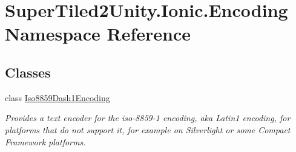 \hypertarget{namespace_super_tiled2_unity_1_1_ionic_1_1_encoding}{}\section{Super\+Tiled2\+Unity.\+Ionic.\+Encoding Namespace Reference}
\label{namespace_super_tiled2_unity_1_1_ionic_1_1_encoding}
\subsection*{Classes}
\begin{DoxyCompactItemize}
\item 
class \mbox{\hyperlink{class_super_tiled2_unity_1_1_ionic_1_1_encoding_1_1_iso8859_dash1_encoding}{Iso8859\+Dash1\+Encoding}}
\begin{DoxyCompactList}\small\item\em Provides a text encoder for the iso-\/8859-\/1 encoding, aka Latin1 encoding, for platforms that do not support it, for example on Silverlight or some Compact Framework platforms. \end{DoxyCompactList}\end{DoxyCompactItemize}
